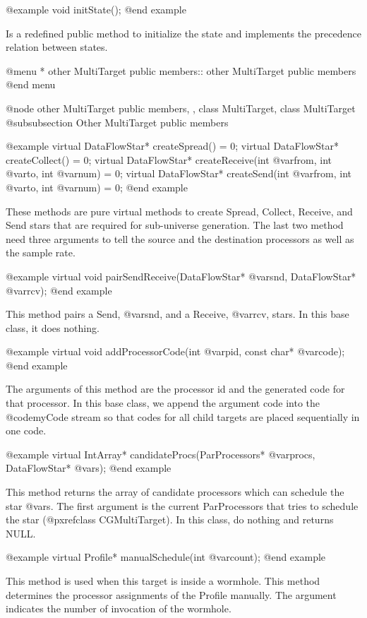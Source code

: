 @example
void initState();
@end example

Is a redefined public method to initialize the state and implements
the precedence relation between states.

@menu
* other MultiTarget public members::	other MultiTarget public members
@end menu

@node other MultiTarget public members, , class MultiTarget, class MultiTarget
@subsubsection Other MultiTarget public members

@example
virtual DataFlowStar* createSpread() = 0;
virtual DataFlowStar* createCollect() = 0;
virtual DataFlowStar* createReceive(int @var{from}, int @var{to}, int @var{num}) = 0;
virtual DataFlowStar* createSend(int @var{from}, int @var{to}, int @var{num}) = 0;
@end example

These methods are pure virtual methods to create Spread, Collect, Receive, and
Send stars that are required for sub-universe generation. The last two method
need three arguments to tell the source and the destination processors as well
as the sample rate.

@example
virtual void pairSendReceive(DataFlowStar* @var{snd}, DataFlowStar* @var{rcv});
@end example

This method pairs a Send, @var{snd}, and a Receive, @var{rcv}, stars. In this
base class, it does nothing.

@example
virtual void addProcessorCode(int @var{pid}, const char* @var{code});
@end example

The arguments of this method are the processor id and the generated code for
that processor. In this base class, we append the argument code into the
@code{myCode} stream so that codes for all child targets are placed
sequentially in one code.

@example
virtual IntArray* candidateProcs(ParProcessors* @var{procs}, DataFlowStar* @var{s});
@end example

This method returns the array of candidate processors which can schedule
the star @var{s}. The first argument is the current ParProcessors that tries to
schedule the star (@pxref{class CGMultiTarget}). In this class, do
nothing and returns NULL.

@example
virtual Profile* manualSchedule(int @var{count});
@end example

This method is used when this target is inside a wormhole. This method
determines the processor assignments of the Profile manually. The argument
indicates the number of invocation of the wormhole.


